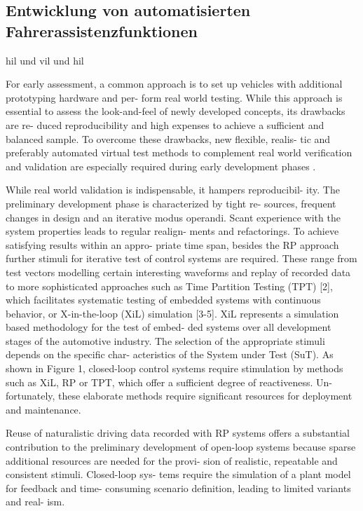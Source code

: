 \subsection{Entwicklung von automatisierten Fahrerassistenzfunktionen}
\label{grundlagen_fahren_entwicklung}

\gls{hil} und \gls{vil} und \gls{hil}

For early assessment, a common approach is to set up vehicles with additional prototyping hardware and per- form real world testing. While this approach is essential to assess the look-and-feel of newly developed concepts, its drawbacks are re- duced reproducibility and high expenses to achieve a sufficient and balanced sample. To overcome these drawbacks, new flexible, realis- tic and preferably automated virtual test methods to complement real world verification and validation are especially required during early development phases \cite{bach2017reactive}.

While real world validation is indispensable, it hampers reproducibil- ity. The preliminary development phase is characterized by tight re- sources, frequent changes in design and an iterative modus operandi. Scant experience with the system properties leads to regular realign- ments and refactorings. To achieve satisfying results within an appro- priate time span, besides the RP approach further stimuli for iterative test of control systems are required. These range from test vectors modelling certain interesting waveforms and replay of recorded data to more sophisticated approaches such as Time Partition Testing (TPT) [2], which facilitates systematic testing of embedded systems with continuous behavior, or X-in-the-loop (XiL) simulation [3-5]. XiL represents a simulation based methodology for the test of embed- ded systems over all development stages of the automotive industry. The selection of the appropriate stimuli depends on the specific char- acteristics of the System under Test (SuT). As shown in Figure 1, closed-loop control systems require stimulation by methods such as XiL, RP or TPT, which offer a sufficient degree of reactiveness. Un- fortunately, these elaborate methods require significant resources for deployment and maintenance. \cite{bach2017reactive}

Reuse of naturalistic driving data recorded with RP systems offers a substantial contribution to the preliminary development of open-loop systems because sparse additional resources are needed for the provi- sion of realistic, repeatable and consistent stimuli. Closed-loop sys- tems require the simulation of a plant model for feedback and time- consuming scenario definition, leading to limited variants and real- ism. \cite{bach2017reactive}

